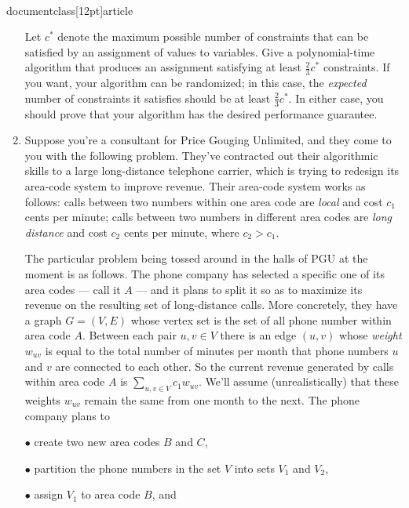 \\documentclass[12pt]{article}
\begin{document}
\begin{enumerate}
Let $c^*$ denote the maximum possible number of constraints
that can be satisfied by an assignment of values to variables.
Give a polynomial-time algorithm that produces an
assignment satisfying at least $\frac23 c^*$ constraints.
If you want, your algorithm can be randomized;
in this case, the {\em expected} number of constraints
it satisfies should be at least $\frac23 c^*$.
In either case, you should prove that your algorithm
has the desired performance guarantee.





\item 

Suppose you're a consultant for
Price Gouging Unlimited, and they come to you with
the following problem.
They've contracted out their algorithmic skills
to a large long-distance telephone carrier,
which is trying to redesign its area-code system to improve revenue.
Their area-code system works as follows:
calls between two numbers within one area code are {\em local}
and cost $c_1$ cents per minute; calls between two numbers
in different area codes are {\em long distance} and cost
$c_2$ cents per minute, where $c_2 > c_1$.

The particular problem being tossed around in the
halls of PGU at the moment is as follows.
The phone company has selected a specific one of its area codes
--- call it $A$ ---
and it plans to split it so as to maximize its revenue on
the resulting set of long-distance calls.
More concretely, they have a graph $G = (V,E)$ whose vertex set
is the set of all phone number within area code $A$.
Between each pair $u, v \in V$ there is an edge $(u,v)$
whose {\em weight} $w_{uv}$ is equal to the total number of
minutes per month that phone numbers $u$ and $v$ are connected
to each other.  So the current revenue generated by calls
within area code $A$ is $\sum_{u,v \in V} c_1 w_{uv}$.
We'll assume (unrealistically) that these weights $w_{uv}$
remain the same from one month to the next.
The phone company plans to

$\bullet$ create two new area codes $B$ and $C$,

$\bullet$ partition the phone numbers in the set $V$ into sets $V_1$ and $V_2$,

$\bullet$ assign $V_1$ to area code $B$, and


\end{enumerate}
\end{document}
